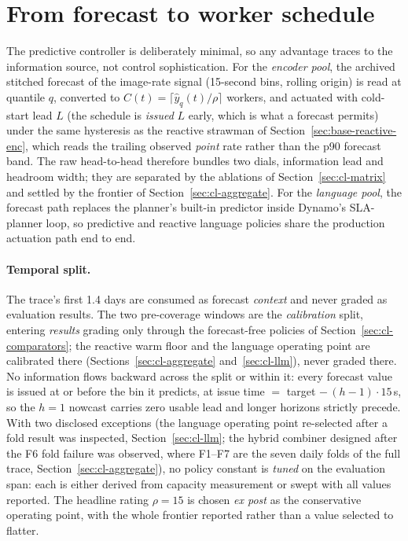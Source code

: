 \section{From forecast to worker schedule}
\label{sec:cl-controller}

The predictive controller is deliberately minimal, so any advantage traces to
the information source, not control sophistication. For the \emph{encoder
pool}, the archived stitched forecast of the image-rate signal (15-second bins,
rolling origin) is read at quantile $q$, converted to $C(t) = \lceil
\hat{y}_q(t) / \rho \rceil$ workers, and actuated with cold-start lead $L$
(the schedule is \emph{issued} $L$ early, which is what a forecast permits)
under the same hysteresis as the reactive strawman of
Section~\ref{sec:base-reactive-enc}, which reads the trailing observed
\emph{point} rate rather than the p90 forecast band. The raw head-to-head
therefore bundles two dials, information lead and headroom width; they are
separated by the ablations of Section~\ref{sec:cl-matrix} and settled by the
frontier of Section~\ref{sec:cl-aggregate}. For the \emph{language pool}, the
forecast path replaces the planner's built-in predictor inside Dynamo's
SLA-planner loop, so predictive and reactive language policies share the
production actuation path end to end.

\paragraph{Temporal split.} The trace's first 1.4 days are consumed as forecast
\emph{context} and never graded as evaluation results. The two pre-coverage
windows are the \emph{calibration} split, entering \emph{results} grading only
through the forecast-free policies of Section~\ref{sec:cl-comparators}; the
reactive warm floor and the language operating point are calibrated there
(Sections~\ref{sec:cl-aggregate} and~\ref{sec:cl-llm}), never graded there. No
information flows backward across the split or within it: every forecast value
is issued at or before the bin it predicts, at issue time $=$ target
$-\,(h{-}1){\cdot}15$\,s, so the $h{=}1$ nowcast carries zero usable lead and
longer horizons strictly precede. With two disclosed exceptions (the
language operating point re-selected after a fold result was inspected,
Section~\ref{sec:cl-llm}; the hybrid combiner designed after the F6 fold
failure was observed, where F1--F7 are the seven daily folds of the full
trace, Section~\ref{sec:cl-aggregate}), no policy constant is
\emph{tuned} on the evaluation span: each is either derived from capacity
measurement or swept with all values reported. The headline rating $\rho{=}15$
is chosen \emph{ex post} as the conservative operating point, with the whole
frontier reported rather than a value selected to flatter.

